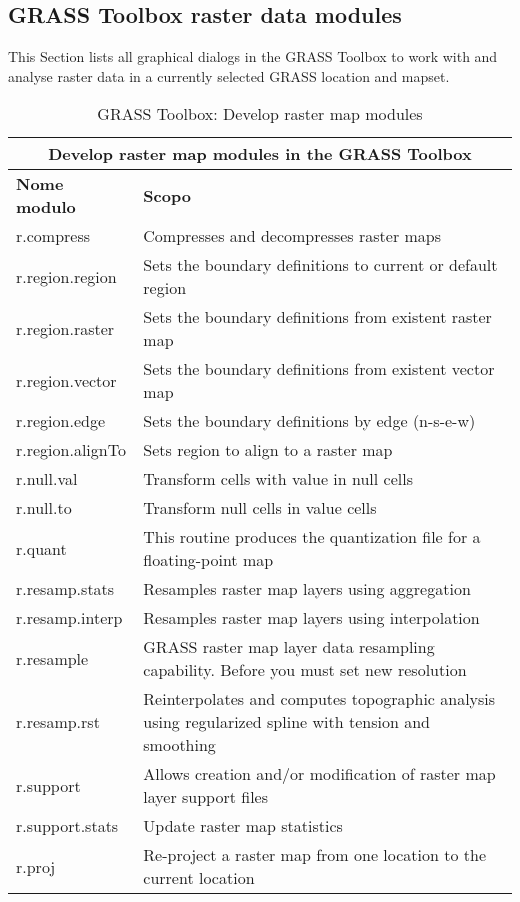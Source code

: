 \clearpage

\subsection{GRASS Toolbox raster data modules}

This Section lists all graphical dialogs in the GRASS Toolbox to work with
and analyse raster data in a currently selected GRASS location and mapset.

\begin{table}[ht]
\centering
\caption{GRASS Toolbox: Develop raster map modules}\medskip
 \begin{tabular}{|p{4cm}|p{12cm}|}
  \hline \multicolumn{2}{|c|}{\textbf{Develop raster map modules in the GRASS
  Toolbox}} \\
  \hline \textbf{Nome modulo} & \textbf{Scopo} \\
  \hline r.compress & Compresses and decompresses raster maps \\
  \hline r.region.region & Sets the boundary definitions to current or
  default region \\
  \hline r.region.raster & Sets the boundary definitions from existent raster
  map\\
  \hline r.region.vector & Sets the boundary definitions from existent vector map \\
  \hline r.region.edge & Sets the boundary definitions by edge (n-s-e-w) \\
  \hline r.region.alignTo & Sets region to align to a raster map\\
  \hline r.null.val & Transform cells with value in null cells\\
  \hline r.null.to & Transform null cells in value cells\\
  \hline r.quant & This routine produces the quantization file for a
  floating-point map \\
  \hline r.resamp.stats & Resamples raster map layers using aggregation \\
  \hline r.resamp.interp & Resamples raster map layers using interpolation \\
  \hline r.resample & GRASS raster map layer data resampling capability.
  Before you must set new resolution\\
  \hline r.resamp.rst & Reinterpolates and computes topographic analysis
  using regularized spline with tension and smoothing \\
  \hline r.support & Allows creation and/or modification of raster map layer
  support files\\
  \hline r.support.stats & Update raster map statistics \\
  \hline r.proj & Re-project a raster map from one location to the current
  location \\
\hline
\end{tabular}
\end{table}

